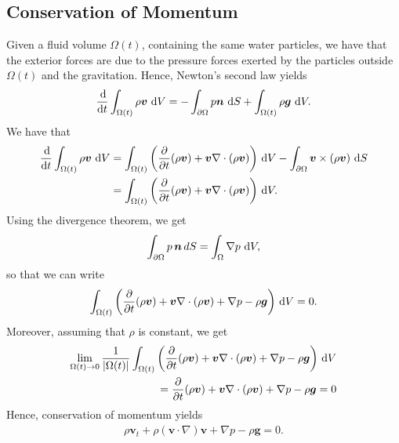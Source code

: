\documentclass[11pt]{article}
\begin{document}
\subsection*{Conservation of Momentum}
Given a fluid volume $\Omega(t)$, containing the same water particles, we have that the exterior forces are
due to the pressure forces exerted by the particles outside $\Omega(t)$ and the gravitation. Hence, Newton's second
law yields
\begin{align*}
    \frac{\operatorname{d}\! }{\operatorname{d}\! t}\int_{\Omega(t)}\rho \bm{v} \, \operatorname{d}\! V = -\int_{\partial \Omega} p \bm{n} \, \operatorname{d}\! S + \int_{\Omega(t)} \rho \bm{g} \, \operatorname{d}\! V.
\end{align*}
We have that
\begin{align*}
	\begin{aligned}
	    \frac{\operatorname{d}\!}{\operatorname{d}\! t} \int_{\Omega(t)} \rho \bm{v} \, \operatorname{d}\! V 
	        & = \int_{\Omega(t)} \bigg(\frac{\partial}{\partial t}(\rho \bm{v})
	                + \bm{v} \nabla \cdot (\rho \bm{v}) \bigg) \, \operatorname{d}\! V
	                - \int_{\partial \Omega} \bm{v} \times (\rho \bm{v}) \, \operatorname{d}\! S \\
	        & = \int_{\Omega(t)} \bigg(\frac{\partial}{\partial t}(\rho \bm{v})
	                + \bm{v} \nabla \cdot (\rho \bm{v}) \bigg) \, \operatorname{d}\! V.           
	\end{aligned}
\end{align*}
Using the divergence theorem, we get
\begin{align*}
    \int_{\partial \Omega} p \, \bm{n} \, d S = \int_{\Omega} \nabla p \, \operatorname{d}\! V,
\end{align*}
so that we can write
\begin{align*}
    \int_{\Omega(t)} \bigg(\frac{\partial}{\partial t}(\rho \bm{v})
	                + \bm{v} \nabla \cdot (\rho \bm{v}) + \nabla p - \rho \bm{g} \bigg) \, \operatorname{d}\! V = 0.
\end{align*}
Moreover, assuming that $\rho$ is constant, we get
\begin{align*}
    \lim_{\Omega(t) \rightarrow 0} \frac{1}{|\Omega(t)|}\int_{\Omega(t)} \bigg(\frac{\partial}{\partial t}(\rho \bm{v})
	                + \bm{v} \nabla \cdot (\rho \bm{v}) + \nabla p - \rho \bm{g} \bigg) \, \operatorname{d}\! V \\
	                = \frac{\partial}{\partial t}(\rho \bm{v})
	                + \bm{v} \nabla \cdot (\rho \bm{v}) + \nabla p - \rho \bm{g} = 0
\end{align*}
Hence, conservation of momentum yields
\begin{align}
    \label{eq:momentumConservation}
    \rho \bm{v}_t + \rho(\bm{v} \cdot \nabla) \bm{v} + \nabla p - \rho \bm{g} = 0.
\end{align}
%
%
\end{document}
